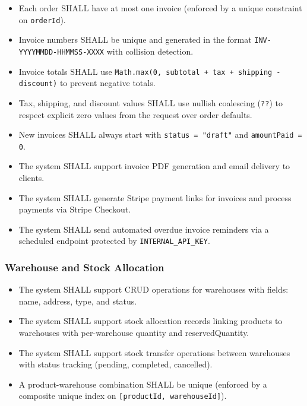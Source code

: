 \documentclass[12pt,onecolumn]{IEEEtran}
\begin{document}
\begin{tcolorbox}[reqbox,title={FR-INV: Invoice Requirements}]
\begin{itemize}[leftmargin=1.5em]
  \item {} Each order SHALL have at most one invoice (enforced by a unique constraint on \texttt{orderId}).
  \item {} Invoice numbers SHALL be unique and generated in the format \texttt{INV-YYYYMMDD-HHMMSS-XXXX} with collision detection.
  \item {} Invoice totals SHALL use \texttt{Math.max(0, subtotal + tax + shipping - discount)} to prevent negative totals.
  \item {} Tax, shipping, and discount values SHALL use nullish coalescing (\texttt{??}) to respect explicit zero values from the request over order defaults.
  \item {} New invoices SHALL always start with \texttt{status = "draft"} and \texttt{amountPaid = 0}.
  \item {} The system SHALL support invoice PDF generation and email delivery to clients.
  \item {} The system SHALL generate Stripe payment links for invoices and process payments via Stripe Checkout.
  \item {} The system SHALL send automated overdue invoice reminders via a scheduled endpoint protected by \texttt{INTERNAL\_API\_KEY}.
\end{itemize}
\end{tcolorbox}

\subsubsection{Warehouse and Stock Allocation}

\begin{tcolorbox}[reqbox,title={FR-WH: Warehouse Requirements}]
\begin{itemize}[leftmargin=1.5em]
  \item {} The system SHALL support CRUD operations for warehouses with fields: name, address, type, and status.
  \item {} The system SHALL support stock allocation records linking products to warehouses with per-warehouse quantity and reservedQuantity.
  \item {} The system SHALL support stock transfer operations between warehouses with status tracking (pending, completed, cancelled).
  \item {} A product-warehouse combination SHALL be unique (enforced by a composite unique index on \texttt{[productId, warehouseId]}).
\end{itemize}
\end{tcolorbox}
\end{document}
